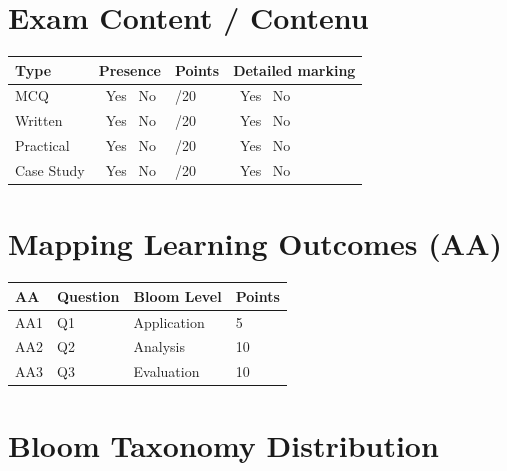 \documentclass[12pt,a4paper]{article}
\newcommand{\cbox}{\ding{110}}
\newcommand{\yesno}{\cbox\ Yes \hspace{0.5cm} \cbox\ No}
\begin{document}
\section*{\colorbox{EspritBleu}{\color{white}Exam Content / Contenu}}

\begin{longtable}{|p{4cm}|p{3cm}|p{3cm}|p{3cm}|}
\hline
Type & Presence & Points & Detailed marking \\ \hline
MCQ & \yesno & /20 & \yesno \\ \hline
Written & \yesno & /20 & \yesno \\ \hline
Practical & \yesno & /20  & \yesno \\ \hline
Case Study & \yesno & /20 & \yesno \\ \hline
\end{longtable}

\section*{\colorbox{EspritBleu}{\color{white}Mapping Learning Outcomes (AA)}}

\begin{longtable}{|p{4cm}|p{3cm}|p{3cm}|p{3cm}|}
\hline
AA & Question & Bloom Level & Points \\ \hline
AA1 & Q1 & Application & 5 \\ \hline
AA2 & Q2 & Analysis & 10 \\ \hline
AA3 & Q3 & Evaluation & 10 \\ \hline
\end{longtable}

\section*{\colorbox{EspritBleu}{\color{white}Bloom Taxonomy Distribution}}

\begin{center}
\end{center}
\end{document}

